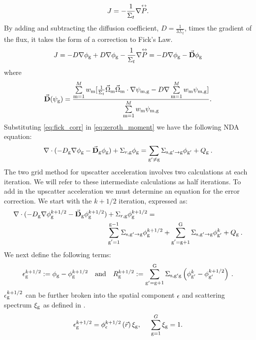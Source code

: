   \begin{equation}
  J= -\frac{1}{\Sigma_t} \nabla \overset{\text{\scriptsize$\leftrightarrow$}}{P}. 
  \end{equation}
  By adding and subtracting the diffusion coefficient, $D = \frac{1}{3\Sigma_t}$, times the gradient of the flux, it takes the form of a correction to Fick's Law. 
  \begin{equation}
  J = -D \nabla \phi_{\mathrm{g}} + D \nabla \phi_{\mathrm{g}} - \frac{1}{\Sigma_t} \nabla \overset{\text{\scriptsize$\leftrightarrow$}}{P} \\
  = -D \nabla \phi_{\mathrm{g}} - \vec{\textbf{D}} \phi_{\mathrm{g}}
  \label{eq:fick_corr}
  \end{equation}
  where 
 \begin{equation}
  \vec{\textbf{D}} (\psi_{\mathrm{g}}) = \frac{\sum\limits_{\mathrm{m}=1}^M w_{\mathrm{m}} [\frac{1}{\Sigma_t} \vec{\Omega}_{\mathrm{m}} \vec{\Omega}_{\mathrm{m}} \cdot \nabla\psi_{\mathrm{m}, \mathrm{g}} - D \nabla \sum\limits_{\mathrm{m}=1}^M w_{\mathrm{m}}\psi_{\mathrm{m}, \mathrm{g}}]}{\sum\limits_{\mathrm{m}=1}^M w_{\mathrm{m}} \psi_{\mathrm{m}, \mathrm{g}}}.
  \end{equation} 
 Substituting \eqref{eq:fick_corr} in \eqref{eq:zeroth_moment} we have the following NDA equation:
  \begin{equation}
  \nabla\cdot(-D_{\mathrm{g}} \nabla \phi_{\mathrm{g}} - \vec{\bf D}_{\mathrm{g}} \phi_{\mathrm{g}}) + \Sigma_{r,\mathrm{g}} \phi_{\mathrm{g}} = \sum\limits_{{\mathrm{g}'}\neq\mathrm{g}}\Sigma_{\mathrm{s},\mathrm{g}' \rightarrow \mathrm{g}}\phi_{\mathrm{g}'} + Q_{\mathrm{g}} \:. \label{eq:NDA}
  \end{equation}
  The two grid method for upscatter acceleration involves two calculations at each iteration. We will refer to these intermediate calculations as half iterations. To add in the upscatter acceleration we must determine an equation for the error correction. We start with the $k + 1/2$ iteration, expressed as:
  \begin{equation}
  \begin{split}
  \nabla\cdot(-D_{\mathrm{g}} \nabla \phi_{\mathrm{g}}^{k+1/2} - \vec{\bf D}_{\mathrm{g}} \phi_{\mathrm{g}}^{k+1/2}) &+ \Sigma_{r,\mathrm{g}} \phi_{\mathrm{g}}^{k+1/2} =  \\ &\sum\limits_{\substack{\mathrm{g}'=1}}^{\mathrm{g-1}} \Sigma_{\mathrm{s},\mathrm{g}' \to\mathrm{g}}\phi_{\mathrm{g}}^{k+1/2} + \sum\limits_{\substack{\mathrm{g}'=\mathrm{g}+1}}^{\mathrm{G}} \Sigma_{\mathrm{s},\mathrm{g}' \to\mathrm{g}}\phi_{\mathrm{g}'}^{k} + Q_{\mathrm{g}}\:. 
  \end{split}
  \label{eq:k1/2}
  \end{equation}
  We next define the following terms:
  \begin{equation}
  \epsilon_{\mathrm{g}}^{k+1/2} := \phi_{\mathrm{g}} - \phi_{\mathrm{g}}^{k + 1/2} \quad \mathrm{and} \quad R_{\mathrm{g}}^{k+1/2} := \sum\limits_{\mathrm{g}'=\mathrm{g}+1}^{\mathrm{G}} \Sigma_{\mathrm{s},\mathrm{g}' \mathrm{g}}\left(\phi_{\mathrm{g}'}^k - \phi_{\mathrm{g}'}^{k + 1/2}\right)\:.
  \end{equation}
  $\epsilon_{\mathrm{g}}^{k + 1/2}$ can be further broken into the spatial component $\epsilon$ and scattering spectrum $\xi_{\mathrm{g}}$ as defined in \cite{morel-upscat,evans-upscat}.
  \begin{equation}
  \epsilon_{\mathrm{g}}^{k+1/2} = \phi_{\epsilon}^{k+1/2}\left(\vec{r}\right)\xi_{\mathrm{g}}, \hspace{5mm} \sum\limits_{\mathrm{g}=1}^G \xi_{\mathrm{g}} = 1.
  \end{equation}
  
